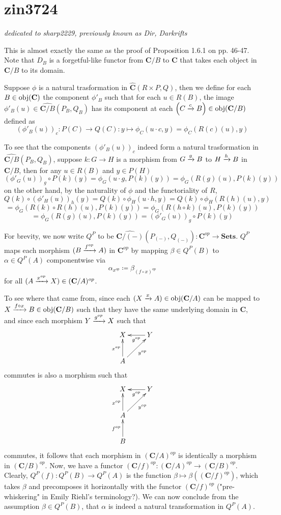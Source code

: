 \section{zin3724}
\emph{dedicated to sharp2229, previously known as Dir, Darkrifts}

This is almost exactly the same as the proof of Proposition 1.6.1 on pp. 46-47. Note that $D_B$ is a forgetful-like functor from $\mathbf C/B$ to $\mathbf C$ that takes each object in $\mathbf C/B$ to its domain.

Suppose $\phi$ is a natural trasformation in $\widehat{\mathbf{C}}(R\times P,Q)$, then we define for each $B\in\operatorname{\operatorname{obj}}(\mathbf C)$ the component $\phi'_B$ such that for each $u\in R(B)$, the image $\phi'_B(u)\in\widehat{\mathbf{C}/B}(P_B,Q_B)$ has its component at each $\left(C\xrightarrow{c}B\right)\in\operatorname{\operatorname{obj}}(\mathbf C/B)$ defined as
\[(\phi'_B(u))_c:P(C)\to Q(C):y\mapsto\phi_C(u\cdot c,y)=\phi_C(R(c)(u),y)\]

To see that the components $(\phi'_B(u))_c$ indeed form a natural trasformation in $\widehat{\mathbf{C}/B}(P_B,Q_B)$, suppose $k:G\to H$ is a morphism from $G\xrightarrow{g}B$ to $H\xrightarrow{h}B$ in $\mathbf{C}/B$, then for any $u\in R(B)$ and $y\in P(H)$
\[(\phi'_G(u))_g\circ P(k)(y)=\phi_G(u\cdot g,P(k)(y))=\phi_G(R(g)(u),P(k)(y))\]
on the other hand, by the naturality of $\phi$ and the functoriality of $R$,
\[Q(k)\circ(\phi'_H(u))_h(y)=Q(k)\circ\phi_H(u\cdot h,y)=Q(k)\circ\phi_H(R(h)(u),y)\]
\[=\phi_G(R(k)\circ R(h)(u),P(k)(y))=\phi_G(R(h\circ k)(u),P(k)(y))\]
\[=\phi_G(R(g)(u),P(k)(y))=(\phi'_G(u))_g\circ P(k)(y)\]

For brevity, we now write $Q^P$ to be $\widehat{\mathbf{C}/(-)}(P_{(-)},Q_{(-)}):\mathbf{C}^{op}\to\mathbf{Sets}$. $Q^P$ maps each morphism $(B\xrightarrow{f^{op}}A)$ in $\mathbf{C}^{op}$ by mapping $\beta\in Q^P(B)$ to $\alpha\in Q^P(A)$ componentwise via
\[\alpha_{x^{op}}\coloneqq\beta_{(f\circ x)^{op}}\]
for all $(A\xrightarrow{x^{op}}X)\in(\mathbf{C}/A)^{op}$.

To see where that came from, since each $(X\xrightarrow{x}A)\in\operatorname{\operatorname{obj}}(\mathbf{C}/A)$ can be mapped to $X\xrightarrow{f\circ x}B\in\operatorname{\operatorname{obj}}(\mathbf{C}/B)$ such that they have the same underlying domain in $\mathbf{C}$,
and since each morphism $Y\xrightarrow{g^{op}}X$ such that 
\[\xymatrix{
    X & Y \ar@{->}[l]^{g^{op}} \\
    A \ar@{->}[ru]_{y^{op}} \ar@{->}[u]^{x^{op}} & 
    }\]
commutes is also a morphism such that
\[\xymatrix{
    X & Y \ar@{->}[l]^{g^{op}} \\
    A \ar@{->}[ru]_{y^{op}} \ar@{->}[u]^{x^{op}} &  \\
    B \ar@{->}[u]^{f^{op}} & 
    }\]
commutes, it follows that each morphism in $(\mathbf{C}/A)^{op}$ is identically a morphism in $(\mathbf{C}/B)^{op}$. Now, we have a functor $(\mathbf{C}/f)^{op}:(\mathbf{C}/A)^{op}\to(\mathbf{C}/B)^{op}$. Clearly, $Q^P(f):Q^P(B)\to Q^P(A)$ is the function $\beta\mapsto\beta((\mathbf{C}/f)^{op})$, which takes $\beta$ and precomposes it horizontally with the functor $(\mathbf{C}/f)^{op}$ ("pre-whiskering" in Emily Riehl's terminology?). We can now conclude from the assumption $\beta\in Q^P(B)$, that $\alpha$ is indeed a natural transformation in $Q^P(A)$.

